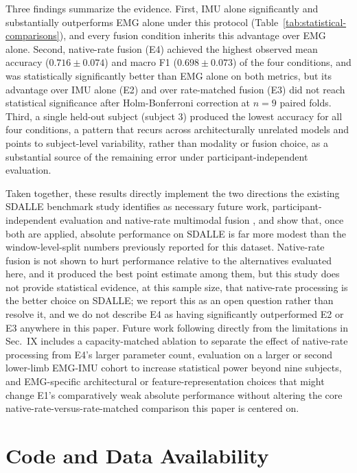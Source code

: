 \documentclass[conference]{IEEEtran}
\begin{document}
Three findings summarize the evidence. First, IMU alone significantly
and substantially outperforms EMG alone under this protocol
(Table~\ref{tab:statistical-comparisons}), and every fusion condition
inherits this advantage over EMG alone. Second, native-rate fusion
(E4) achieved the highest observed mean accuracy ($0.716 \pm 0.074$)
and macro F1 ($0.698 \pm 0.073$) of the four conditions, and was
statistically significantly better than EMG alone on both metrics,
but its advantage over IMU alone (E2) and over rate-matched fusion
(E3) did not reach statistical significance after Holm-Bonferroni
correction at $n=9$ paired folds. Third, a single held-out subject
(subject 3) produced the lowest accuracy for all four conditions, a
pattern that recurs across architecturally unrelated models and
points to subject-level variability, rather than modality or fusion
choice, as a substantial source of the remaining error under
participant-independent evaluation.

Taken together, these results directly implement the two directions
the existing SDALLE benchmark study identifies as necessary future
work, participant-independent evaluation and native-rate multimodal
fusion \cite{farouk2026sdalle}, and show that, once both are applied,
absolute performance on SDALLE is far more modest than the
window-level-split numbers previously reported for this dataset.
Native-rate fusion is not shown to hurt performance relative to the
alternatives evaluated here, and it produced the best point estimate
among them, but this study does not provide statistical evidence, at
this sample size, that native-rate processing is the better choice on
SDALLE; we report this as an open question rather than resolve it,
and we do not describe E4 as having significantly outperformed E2 or
E3 anywhere in this paper. Future work following directly from the
limitations in Sec.~IX includes a capacity-matched ablation to
separate the effect of native-rate processing from E4's larger
parameter count, evaluation on a larger or second lower-limb EMG-IMU
cohort to increase statistical power beyond nine subjects, and
EMG-specific architectural or feature-representation choices that
might change E1's comparatively weak absolute performance without
altering the core native-rate-versus-rate-matched comparison this
paper is centered on.

\section*{Code and Data Availability}
\label{sec:availability}
\end{document}
